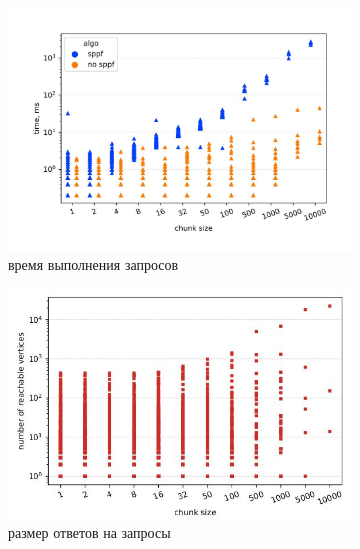 \documentclass[14pt]{matmex-diploma-custom}
\theoremstyle{definition}
\begin{document}
    \begin{figure}[H]
    \begin{center}
        \begin{subfigure}[b]{0.8\textwidth}
    \centering
    \includegraphics[width=\columnwidth]{pics/enzyme_sppf_bt.pdf_1.jpg}  \caption{время выполнения запросов}
    \label{fig:subim1}
    \end{subfigure}%
    \end{center}
    \begin{subfigure}[b]{0.5\textwidth}
    \centering
    \includegraphics[width=\textwidth]{pics/enzyme_ans_bt.pdf_1.jpg} \caption{размер ответов на запросы}
    \label{fig:subim2}
    \end{subfigure}
        \begin{subfigure}[b]{0.5\textwidth}
    \centering

\end{subfigure}
\end{figure}
\end{document}
